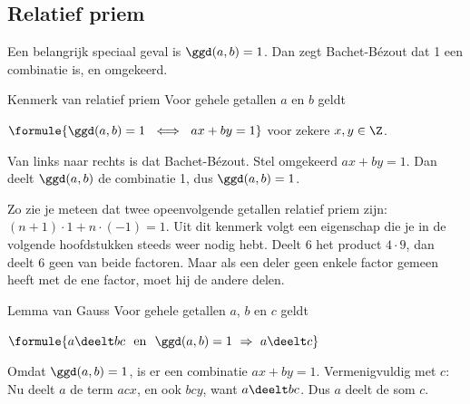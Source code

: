 \begin{oefeningen}
\end{oefeningen}

\subsection{Relatief priem}

Een belangrijk speciaal geval is $\ggd(a, b) = 1$. Dan zegt Bachet-Bézout dat 1 een combinatie is, en omgekeerd.

\begin{theorie}
\begin{stelling}{Kenmerk van relatief priem}
Voor gehele getallen $a$ en $b$ geldt

\vspace{1mm}
\qquad $\formule{\ggd(a, b) = 1 \ \iff \ ax + by = 1}$ \quad voor zekere $x, y \in \Z$.
\end{stelling}

\begin{bewijs}
Van links naar rechts is dat Bachet-Bézout. Stel omgekeerd $ax + by = 1$. Dan deelt $\ggd(a, b)$ de combinatie 1, dus $\ggd(a, b) = 1$.
\end{bewijs}
\end{theorie}

Zo zie je meteen dat twee opeenvolgende getallen relatief priem zijn: $(n + 1) \cdot 1 + n \cdot (-1) = 1$. Uit dit kenmerk volgt een eigenschap die je in de volgende hoofdstukken steeds weer nodig hebt. Deelt 6 het product $4 \cdot 9$, dan deelt 6 geen van beide factoren. Maar als een deler geen enkele factor gemeen heeft met de ene factor, moet hij de andere delen.

\begin{theorie}
\begin{stelling}{Lemma van Gauss}
Voor gehele getallen $a$, $b$ en $c$ geldt

\vspace{1mm}
\qquad $\formule{a \deelt bc \ \text{ en } \ \ggd(a, b) = 1 \ \Rightarrow \ a \deelt c}$
\end{stelling}

\begin{bewijs}
Omdat $\ggd(a, b) = 1$, is er een combinatie $ax + by = 1$. Vermenigvuldig met $c$:
Nu deelt $a$ de term $acx$, en ook $bcy$, want $a \deelt bc$. Dus $a$ deelt de som $c$.
\end{bewijs}
\end{theorie}

